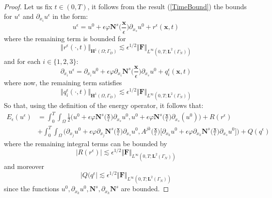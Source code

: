 \begin{proof}
Let us fix $t \in (0,T)$, it follows from the result (\ref{TimeBound}) the bounds for $u^{\epsilon}$ and $\partial_{x_i} u^{\epsilon}$ in the form:
\begin{equation*}
    u^{\epsilon} = u^0 + \epsilon \varphi \mathbf{N}^s\big( \frac{\mathbf{x}}{\epsilon} \big) \partial_{x_s} u^0 + r^{\epsilon}(\mathbf{x},t) 
\end{equation*}
where the remaining term is bounded for
\begin{equation*}
    \Vert r^{\epsilon}(\cdot, t) \Vert_{\mathbf{H}^1(\Omega; \Gamma_D)} \lesssim \epsilon^{1/2} \Vert \mathbf{F}\Vert_{L^{\infty}(0,T;\mathbf{L}^{2}(\Gamma_N))}
\end{equation*}
and for each $i \in \{1,2,3\}$:
\begin{equation*}
    \partial_{x_i} u^{\epsilon} = \partial_{x_i} u^0 + \epsilon \varphi \partial_{x_i} \mathbf{N}^s \big( \frac{\mathbf{x}}{\epsilon} \big) \partial_{x_s} u^0 + q^{\epsilon}_i(\mathbf{x},t)
\end{equation*}
where now, the remaining term satisfies 
\begin{equation*}
    \Vert q^{\epsilon}_i(\cdot, t) \Vert_{\mathbf{H}^1(\Omega, \Gamma_D)} \lesssim \epsilon^{1/2} \Vert \mathbf{F}\Vert_{L^{\infty}(0,T; \mathbf{L}^{2}(\Gamma_N))}
\end{equation*}
So that, using the definition of the energy operator, it follows that:
\begin{align*}
    E_{\epsilon}(u^{\epsilon}) &= \int_0^T \int_{\Omega} \frac{1}{2}(u^0 + \epsilon \varphi \mathbf{N}^s \big( \frac{\mathbf{x}}{\epsilon} \big) \partial_{x_s} u^0, u^0 + \epsilon \varphi \mathbf{N}^s \big( \frac{\mathbf{x}}{\epsilon} \big) \partial_{x_s} (u^0) \big) + R(r^{\epsilon}) \\
    & + \int_0^T \int_{\Omega} \big( \partial_{x_j} u^0 + \epsilon \varphi \partial_{x_j} \mathbf{N}^s \big( \frac{\mathbf{x}}{\epsilon} \big) \partial_{x_s} u^0, A^{jk} \big(\frac{\mathbf{x}}{\epsilon} \big) \big[\partial_{x_k} u^0 + \epsilon \varphi \partial_{x_k} \mathbf{N}^s \big( \frac{\mathbf{x}}{\epsilon}\big) \partial_{x_s} u^0 \big] \big) + Q(q^{\epsilon})
\end{align*}
where the remaining integral terms can be bounded by
\begin{equation*}
    \vert R(r^{\epsilon}) \vert \lesssim \epsilon^{1/2} \Vert \mathbf{F}\Vert_{L^{\infty}(0,T;\mathbf{L}^{2}(\Gamma_N))} 
\end{equation*}
and moreover
\begin{equation*}
    \vert Q(q^{\epsilon} \vert \lesssim \epsilon^{1/2} \Vert \mathbf{F}\Vert_{L^{\infty}(0,T;\mathbf{L}^{2}(\Gamma_N))}
\end{equation*}
since the functions $u^0, \partial_{x_k}u^0, \mathbf{N}^s, \partial_{x_k} \mathbf{N}^s$ are bounded.
\end{proof}

